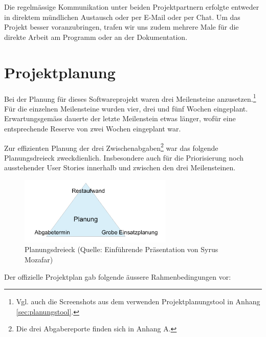Die regelmässige Kommunikation unter beiden Projektpartnern erfolgte entweder in
direktem mündlichen Austausch oder per E-Mail oder per Chat. Um das Projekt
besser voranzubringen, trafen wir uns zudem mehrere Male für die direkte Arbeit
am Programm oder an der Dokumentation.

\section{Projektplanung}

Bei der Planung für dieses Softwareprojekt waren drei Meilensteine
anzusetzen.\footnote{Vgl. auch die Screenshots aus dem verwenden
Projektplanungstool in Anhang \ref{sec:planungstool}.} Für die einzelnen
Meilensteine wurden vier, drei und fünf Wochen eingeplant. Erwartungsgemäss
dauerte der letzte Meilenstein etwas länger, wofür eine entsprechende Reserve
von zwei Wochen eingeplant war.

Zur effizienten Planung der drei Zwischenabgaben\footnote{Die drei Abgabereporte
finden sich in Anhang A.} war das folgende Planungsdreieck zweckdienlich.
Insbesondere auch für die Priorisierung noch ausstehender User Stories innerhalb
und zwischen den drei Meilensteinen. \\

\begin{figure}[h]
  \centering
	\includegraphics [width=0.65\textwidth]{images/Planungsdreieck.png}
	\caption{Planungsdreieck (Quelle: Einführende Präsentation von Syrus Mozafar)}
\end{figure}

\noindent
Der offizielle Projektplan gab folgende äussere Rahmenbedingungen vor:

